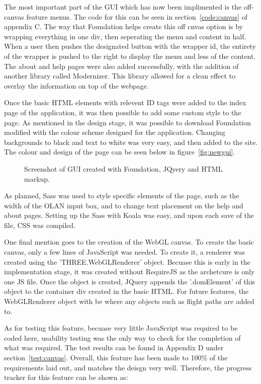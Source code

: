 The most important part of the GUI which has now been implimented is the off-canvas feature menus. The code for this can be seen in section~\ref{code:canvas} of appendix C. The way that Foundation helps create this off cnvas option is by wrapping everything in one div, then seperating the menu and content in half. When a user then pushes the designated button with the wrapper id, the entirety of the wrapper is pushed to the right to display the menu and less of the content. The about and help pages were also added successfully, with the addition of another library called Modernizer. This library allowed for a clean effect to overlay the information on top of the webpage.

Once the basic HTML elements with relevent ID tags were added to the index page of the application, it was then possible to add some custom style to the page. As mentioned in the design stage, it was possible to download Foundation modified with the colour scheme designed for the application. Changing backgrounds to black and text to white was very easy, and then added to the site. The colour and design of the page can be seen below in figure~\ref{fig:newgui}.

\begin{figure}[h]
  \centering
  \caption{Screenshot of GUI created with Foundation, JQyery and HTML markup.}
  \label{fig:mod}
\end{figure}

As planned, Sass was used to style specific elements of the page, such as the width of the OLAN input box, and to change text placement on the help and about pages. Setting up the Sass with Koala was easy, and upon each save of the file, CSS was compiled. 

One final mention goes to the creation of the WebGL canvas. To create the basic canvas, only a few lines of JavaScript was needed. To create it, a renderer was created using  the 'THREE.WebGLRenderer' object. Becuase this is early in the implementation stage, it was created without RequireJS as the archetcure is only one JS file. Once the object is created, JQuery appends the '.domElement' of this object to the container div created in the basic HTML. For future features, the WebGLRenderer object with be where any objects such as flight paths are added to.

As for testing this feature, becuase very little JavaScript was required to be coded here, usability testing was the only way to check for the completion of what was required. The test results can be found in Appendix D under section~\ref{test:canvas}. Overall, this feature has been made to 100\% of the requirements laid out, and matches the deisgn very well. Therefore, the progress tracker for this feature can be shown as:

